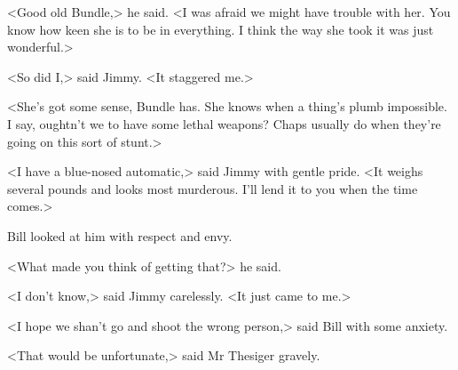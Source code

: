 <Good old Bundle,> he said. <I was afraid we might have trouble with her. You know how keen she is to be in everything. I think the way she took it was just wonderful.>

<So did I,> said Jimmy. <It staggered me.>

<She's got some sense, Bundle has. She knows when a thing's plumb impossible. I say, oughtn't we to have some lethal weapons? Chaps usually do when they're going on this sort of stunt.>

<I have a blue-nosed automatic,> said Jimmy with gentle pride. <It weighs several pounds and looks most murderous. I'll lend it to you when the time comes.>

Bill looked at him with respect and envy.

<What made you think of getting that?> he said.

<I don't know,> said Jimmy carelessly. <It just came to me.>

<I hope we shan't go and shoot the wrong person,> said Bill with some anxiety.

<That would be unfortunate,> said Mr Thesiger gravely.